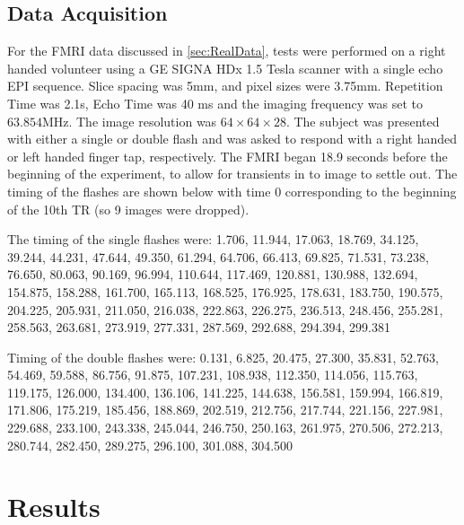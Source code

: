 \documentclass[journal]{./IEEEtran}
\begin{document}
\subsection{Data Acquisition}
\label{sec:MethodsData}
For the FMRI data discussed in \autoref{sec:RealData}, tests were
performed on a right handed volunteer using a GE SIGNA HDx 1.5 Tesla
scanner with a single echo EPI sequence. Slice spacing was
5mm, and pixel sizes were 3.75mm.  Repetition Time was 2.1s,
Echo Time was 40 ms and the imaging frequency was set to $63.854$MHz.
The image resolution was $64 \times 64 \times 28$.
The subject was presented with either a single or
double flash and was asked to respond with a right handed
or left handed finger tap, respectively. The FMRI began 18.9 seconds
before the beginning of the experiment, to allow for transients
in to image to settle out. The timing of the flashes are shown
below with time 0 corresponding to the beginning of
the 10th TR (so 9 images were dropped).

The timing of the single flashes were:
1.706, 11.944, 17.063, 18.769, 34.125, 39.244, 44.231, 47.644, 49.350,
61.294, 64.706, 66.413, 69.825, 71.531, 73.238, 76.650, 80.063,
90.169, 96.994, 110.644, 117.469, 120.881, 130.988, 132.694, 154.875,
158.288, 161.700, 165.113, 168.525, 176.925, 178.631, 183.750, 190.575,
204.225, 205.931, 211.050, 216.038, 222.863, 226.275, 236.513, 248.456,
255.281, 258.563, 263.681, 273.919, 277.331, 287.569, 292.688, 294.394,
299.381

Timing of the double flashes were:
0.131, 6.825, 20.475, 27.300, 35.831, 52.763, 54.469, 59.588, 86.756,
91.875, 107.231, 108.938, 112.350, 114.056, 115.763, 119.175, 126.000,
134.400, 136.106, 141.225, 144.638, 156.581, 159.994, 166.819, 171.806,
175.219, 185.456, 188.869, 202.519, 212.756, 217.744, 221.156, 227.981,
229.688, 233.100, 243.338, 245.044, 246.750, 250.163, 261.975, 270.506,
272.213, 280.744, 282.450, 289.275, 296.100, 301.088, 304.500

\section{Results}
\label{sec:Results}
\end{document}
